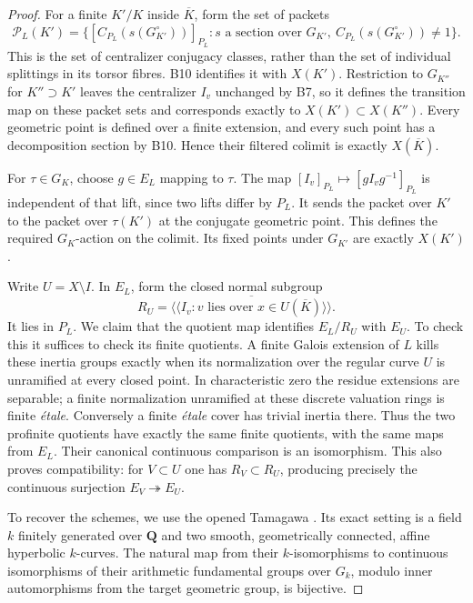 \begin{proof}
For a finite $K'/K$ inside $\overline K$, form the set of packets
\[
 \mathscr P_L(K')=
 \bigl\{[C_{P_L}(s(G_{K'}^\circ))]_{P_L}:
            s\text{ a section over }G_{K'},\ C_{P_L}(s(G_{K'}^\circ))\ne1\bigr\}.
\]
This is the set of centralizer conjugacy classes, rather than the set
of individual splittings in its torsor fibres. B10 identifies it with
$X(K')$. Restriction to $G_{K''}$ for $K''\supset K'$ leaves the
centralizer $I_v$ unchanged by B7, so it defines the transition map on
these packet sets and corresponds exactly to $X(K')\subset X(K'')$.
Every geometric point is defined over a finite extension, and every
such point has a decomposition section by B10. Hence their filtered
colimit is exactly $X(\overline K)$.

For $\tau\in G_K$, choose $g\in E_L$ mapping to $\tau$. The map
$[I_v]_{P_L}\mapsto[gI_vg^{-1}]_{P_L}$ is independent of that lift,
since two lifts differ by $P_L$. It sends the packet over $K'$ to the
packet over $\tau(K')$ at the conjugate geometric point. This defines
the required $G_K$-action on the colimit. Its fixed points under
$G_{K'}$ are exactly $X(K')$.

Write $U=X\setminus I$. In $E_L$, form the closed normal subgroup
\[
 R_U=\overline{\langle\!\langle I_v:
       v\text{ lies over }x\in U(\overline K)\rangle\!\rangle}.
\]
It lies in $P_L$. We claim that the quotient map identifies
$E_L/R_U$ with $E_U$. To check this it suffices to check its finite
quotients. A finite Galois extension of $L$ kills these inertia groups
exactly when its normalization over the regular curve $U$ is unramified
at every closed point. In characteristic zero the residue extensions are
separable; a finite normalization unramified at these discrete valuation
rings is finite \emph{\'etale}. Conversely a finite \emph{\'etale} cover
has trivial inertia there. Thus the two profinite quotients have exactly
the same finite quotients, with the same maps from $E_L$. Their canonical
continuous comparison is an isomorphism. This also proves compatibility:
for $V\subset U$ one has $R_V\subset R_U$, producing precisely the
continuous surjection $E_V\twoheadrightarrow E_U$.

To recover the schemes, we use the opened Tamagawa
\cite[Theorem (0.3), with Conjecture (0.1)(ii) as its stated formulation]
{B_Tamagawa1997}. Its exact setting is a field $k$ finitely generated over
$\mathbf Q$ and two smooth, geometrically connected, affine hyperbolic
$k$-curves. The natural map from their $k$-isomorphisms to continuous
isomorphisms of their arithmetic fundamental groups over $G_k$, modulo
inner automorphisms from the target geometric group, is bijective.


\end{proof}
